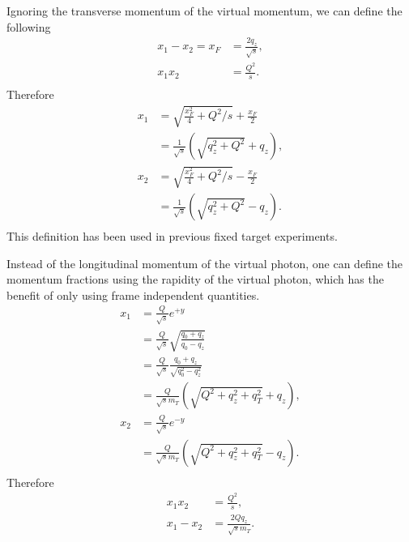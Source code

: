 \documentclass[../main.tex]{subfiles}
\begin{document}
Ignoring the transverse momentum of the virtual momentum, we can define the following
\begin{equation}
	\begin{split}
		x_1-x_2=x_F &= \frac{2q_z}{\sqrt{s}},\\
		x_1x_2 &= \frac{Q^2}{s}.\\
	\end{split}
\end{equation}
Therefore
\begin{equation}
	\begin{split}
		x_1 &= \sqrt{\frac{x_F^2}{4}+Q^2/s}+\frac{x_F}{2} \\
		&=\frac{1}{\sqrt{s}}\left(\sqrt{q_z^2+Q^2}+q_z \right),\\
		x_2 &= \sqrt{\frac{x_F^2}{4}+Q^2/s}-\frac{x_F}{2} \\
		&=\frac{1}{\sqrt{s}}\left(\sqrt{q_z^2+Q^2}-q_z \right).\\
	\end{split}
\end{equation}
This definition has been used in previous fixed target experiments.


Instead of the longitudinal momentum of the virtual photon, one can define
the momentum fractions using the rapidity of the virtual photon, which has the benefit
of only using frame independent quantities.
\begin{equation}
	\begin{split}
		x_1 &= \frac{Q}{\sqrt{s}} e^{+y}\\
		&= \frac{Q}{\sqrt{s}} \sqrt{ \frac{q_0+q_z}{q_0-q_z} }\\
		&= \frac{Q}{\sqrt{s}} \frac{q_0+q_z}{\sqrt{q_0^2-q_z^2}}\\
		&=\frac{Q}{\sqrt{s}m_T}\left(\sqrt{Q^2+q_z^2+q_T^2}+q_z\right),\\
		x_2 &= \frac{Q}{\sqrt{s}} e^{-y}\\
		&= \frac{Q}{\sqrt{s}m_T}\left(\sqrt{Q^2+q_z^2+q_T^2}-q_z\right).\\
	\end{split}
\end{equation}
Therefore
\begin{equation}
	\begin{split}
		x_1x_2 &= \frac{Q^2}{s},\\
		x_1-x_2 &= \frac{2Qq_z}{\sqrt{s}m_T}.
	\end{split}
\end{equation}
\end{document}
